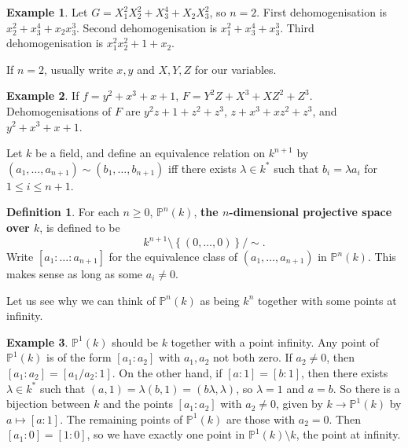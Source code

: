 \documentclass{article}
\renewcommand{\P}{\mathbb{P}}
\newcommand{\rb}[1]{\left( #1 \right)}
\renewcommand{\sb}[1]{\left[ #1 \right]}
\newcommand{\cb}[1]{\left\{ #1 \right\}}
\theoremstyle{definition}\newtheorem{definition}{Definition}[section]
\theoremstyle{definition}\newtheorem{remark}[definition]{Remark}
\theoremstyle{definition}\newtheorem*{example}{Example}
\theoremstyle{definition}\newtheorem*{note}{Note}
\begin{document}
\begin{example}
Let $ G = X_1^2X_2^2 + X_3^4 + X_2X_3^2 $, so $ n = 2 $. First dehomogenisation is $ x_2^2 + x_3^4 + x_2x_3^3 $. Second dehomogenisation is $ x_1^2 + x_3^4 + x_3^3 $. Third dehomogenisation is $ x_1^2x_2^2 + 1 + x_2 $.
\end{example}

If $ n = 2 $, usually write $ x, y $ and $ X, Y, Z $ for our variables.

\begin{example}
If $ f = y^2 + x^3 + x + 1 $, $ F = Y^2Z + X^3 + XZ^2 + Z^3 $. Dehomogenisations of $ F $ are $ y^2z + 1 + z^2 + z^3 $, $ z + x^3 + xz^2 + z^3 $, and $ y^2 + x^3 + x + 1 $.
\end{example}

Let $ k $ be a field, and define an equivalence relation on $ k^{n + 1} $ by $ \rb{a_1, \dots, a_{n + 1}} \sim \rb{b_1, \dots, b_{n + 1}} $ iff there exists $ \lambda \in k^* $ such that $ b_i = \lambda a_i $ for $ 1 \le i \le n + 1 $.

\begin{definition}
For each $ n \ge 0 $, $ \P^n\rb{k} $, \textbf{the $ n $-dimensional projective space over $ k $}, is defined to be
$$ k^{n + 1} \setminus \cb{\rb{0, \dots, 0}} / \sim. $$
Write $ \sb{a_1 : \dots : a_{n + 1}} $ for the equivalence class of $ \rb{a_1, \dots, a_{n + 1}} $ in $ \P^n\rb{k} $. This makes sense as long as some $ a_i \ne 0 $.
\end{definition}

Let us see why we can think of $ \P^n\rb{k} $ as being $ k^n $ together with some points at infinity.

\begin{example}
$ \P^1\rb{k} $ should be $ k $ together with a point infinity. Any point of $ \P^1\rb{k} $ is of the form $ \sb{a_1 : a_2} $ with $ a_1, a_2 $ not both zero. If $ a_2 \ne 0 $, then $ \sb{a_1 : a_2} = \sb{a_1 / a_2 : 1} $. On the other hand, if $ \sb{a : 1} = \sb{b : 1} $, then there exists $ \lambda \in k^* $ such that $ \rb{a, 1} = \lambda\rb{b, 1} = \rb{b\lambda, \lambda} $, so $ \lambda = 1 $ and $ a = b $. So there is a bijection between $ k $ and the points $ \sb{a_1 : a_2} $ with $ a_2 \ne 0 $, given by $ k \to \P^1\rb{k} $ by $ a \mapsto \sb{a : 1} $. The remaining points of $ \P^1\rb{k} $ are those with $ a_2 = 0 $. Then $ \sb{a_1 : 0} = \sb{1 : 0} $, so we have exactly one point in $ \P^1\rb{k} \setminus k $, the point at infinity.
\end{example}
\end{document}
